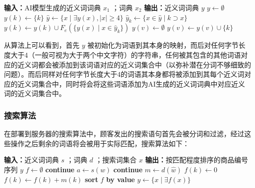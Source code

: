 \vspace{1em}
\begin{algorithmic}
	\STATE \textbf{输入：}AI模型生成的近义词词典 $x_1$ ；词典 $x_2$
	\STATE \textbf{输出：}近义词词典 $y$
	\STATE $y \gets \emptyset$
		\STATE $y(k) \gets \{k\}$
	\ENDFOR
	\STATE $\hat{y} \gets \{x \mid \exists y(x), \lvert x \rvert \geq 4 \}$
		\STATE $\hat{y}_k \gets \{x \in \hat{y} \mid k \supset x \}$
		\STATE $y(k) \gets y(k) \cup F_e(\{y(x) \mid x \in \hat{y}_k\})$
	\ENDFOR
				\STATE $y(v) \gets \emptyset$
			\ENDIF
			\STATE $y(v) \gets y(v) \cup \{k\}$
		\ENDFOR
	\ENDFOR
\end{algorithmic}
\vspace{1em}

从算法上可以看到，首先 $y$ 被初始化为词语到其本身的映射，而后对任何字节长度大于4（一般可视为大于两个中文字符）的字符串，任何被其包含的其他词语对应的近义词都会被添加到该词语对应的近义词集合中（以弥补潜在分词不够细致的问题）。而后同样对任何字节长度大于4的词语其本身都将被添加到其每个近义词对应的近义词集合中，同时将会将这些词语添加为AI生成的近义词词典中对应近义词的近义词集合中。

\subsubsection{搜索算法}

在部署到服务器的搜索算法中，顾客发出的搜索语句首先会被分词和过滤，经过这些操作之后剩余的词语将会被用于实际匹配，搜索算法如下：

\vspace{1em}
\begin{algorithmic}
	\STATE \textbf{输入：}近义词词典 $s$ ；词典 $d$ ；搜索词集合 $x$
	\STATE \textbf{输出：}按匹配程度排序的商品编号序列 $y$
	\STATE $f \gets \emptyset$
			\STATE \textbf{continue}
		\ENDIF
		\STATE $a \gets s(w)$
				\STATE \textbf{continue}
			\ENDIF
			\STATE $m \gets d(\hat{w})$
					\STATE $f(k) \gets 0$
				\ENDIF
				\STATE $f(k) \gets f(k) + m(k)$
			\ENDFOR
		\ENDFOR
	\ENDFOR
	\STATE \textbf{sort} $f$ \textbf{by value} 
	\STATE $y \gets \{x \mid \exists f(x)\}$
\end{algorithmic}
\vspace{1em}

